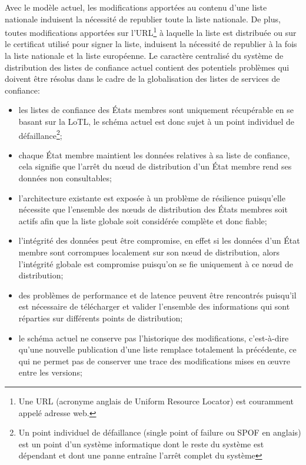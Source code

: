 \documentclass{tnreport}
\begin{document}
Avec le modèle actuel, les modifications apportées au contenu d'une liste nationale induisent la nécessité de republier toute la liste nationale. De plus, toutes modifications apportées sur l'URL\footnote{Une URL (acronyme anglais de Uniform Resource Locator) est couramment appelé adresse web.} à laquelle la liste est distribuée ou sur le certificat utilisé pour signer la liste, induisent la nécessité de republier à la fois la liste nationale et la liste européenne.
Le caractère centralisé du système de distribution des listes de confiance actuel contient des potentiels problèmes qui doivent être résolus dans le cadre de la globalisation des listes de services de confiance:
\begin{itemize}
	\item les listes de confiance des États membres sont uniquement récupérable en se basant sur la LoTL, le schéma actuel est donc sujet à un point individuel de défaillance\footnote{Un point individuel de défaillance (single point of failure ou SPOF en anglais) est un point d'un système informatique dont le reste du système est dépendant et dont une panne entraîne l'arrêt complet du système};
	\item chaque État membre maintient les données relatives à sa liste de confiance, cela signifie que l'arrêt du nœud de distribution d'un État membre rend ses données non consultables;
	\item l'architecture existante est exposée à un problème de résilience puisqu'elle nécessite que l'ensemble des nœuds de distribution des États membres soit actifs afin que la liste globale soit considérée complète et donc fiable;
	\item l'intégrité des données peut être compromise, en effet si les données d'un État membre sont corrompues localement sur son nœud de distribution, alors l'intégrité globale est compromise puisqu'on se fie uniquement à ce nœud de distribution;
	\item des problèmes de performance et de latence peuvent être rencontrés puisqu'il est nécessaire de télécharger et valider l'ensemble des informations qui sont réparties sur différents points de distribution;
	\item le schéma actuel ne conserve pas l'historique des modifications, c'est-à-dire qu'une nouvelle publication d'une liste remplace totalement la précédente, ce qui ne permet pas de conserver une trace des modifications mises en œuvre entre les versions;
\end{itemize}
\end{document}

